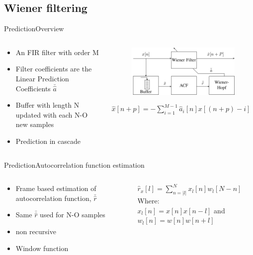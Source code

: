 \subsection{Wiener filtering}
\begin{frame}{Prediction}{Overview}
	\begin{columns}
		\begin{column}{0.5\textwidth}
			\begin{itemize}
				\item An FIR filter with order M
				\item Filter coefficients are the Linear Prediction Coefficients $\bar{\hat{a}}$
				\item Buffer with length N updated with each N-O new samples
				\item Prediction in cascade 
			\end{itemize}
		\end{column}
		\begin{column}{0.5\textwidth} 
			\begin{figure}
				\includegraphics[width=\textwidth]{figures/WienerHopf}
			\end{figure}
		$\hat{x}[n+p] =- \sum^{M-1}_{i=1}\hat{a}_i[n]x[(n+p)-i]$
		\end{column}
	\end{columns}
\end{frame}



\begin{frame}{Prediction}{Autocorrelation function estimation}
	\begin{columns}
		\begin{column}{0.5\textwidth}
			\begin{itemize}
				\item Frame based estimation of autocorrelation function, $\bar{\hat{r}}$
				\item Same  $\bar{\hat{r}}$ used for N-O samples
				\item non recursive
				\item Window function
			\end{itemize}
		\end{column}
		\begin{column}{0.5\textwidth} 
			$\hat{r}_x[l] = \sum^{N}_{n=\left| l\right|} x_l[n]w_l[N-n]$\\
			\vspace{5mm}
			Where: \\
			$x_l[n]=x[n]x[n-l]$ and $w_l[n]=w[n]w[n+l]$
		\end{column}
	\end{columns}
\end{frame}

